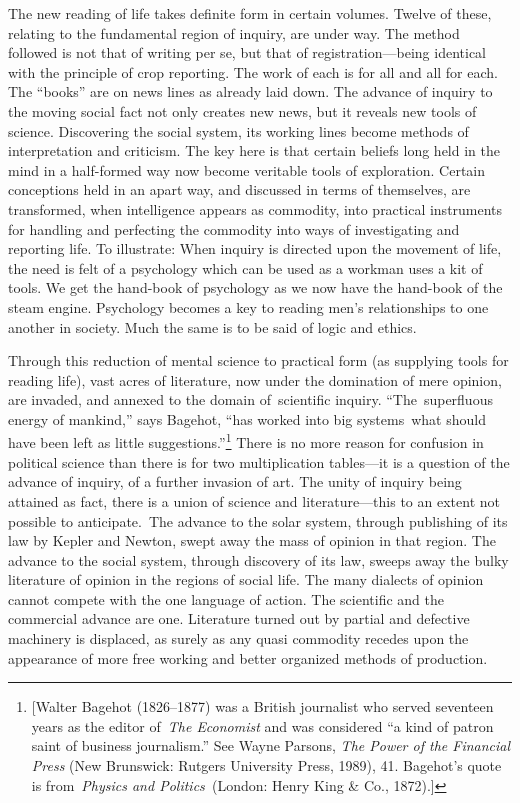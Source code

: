 \documentclass[openany,nobib]{tufte-book}
\begin{document}
The new reading of life takes definite form in certain volumes. Twelve
of these, relating to the fundamental region of inquiry, are under way.
The method followed is not that of writing per se, but that of
registration---being identical with the principle of crop reporting. The
work of each is for all and all for each. The ``books'' are on news
lines as already laid down. The advance of inquiry to the moving social
fact not only creates new news, but it reveals new tools of science.
Discovering the social system, its working lines become methods of
interpretation and criticism. The key here is that certain beliefs long
held in the mind in a half-formed way now become veritable tools of
exploration. Certain conceptions held in an apart way, and discussed in
terms of themselves, are transformed, when intelligence appears as
commodity, into practical instruments for handling and perfecting the
commodity into ways of investigating and reporting life. To illustrate:
When inquiry is directed upon the movement of life, the need is felt of
a psychology which can be used as a workman uses a kit of tools. We get
the hand-book of psychology as we now have the hand-book of the steam
engine. Psychology becomes a key to reading men's relationships to one
another in society. Much the same is to be said of logic and ethics.~

Through this reduction of mental science to practical form (as supplying
tools for reading life), vast acres of literature, now under the
domination of mere opinion, are invaded, and annexed to the domain
of~scientific inquiry. ``The~superfluous energy of mankind,'' says
Bagehot, ``has worked into big systems~what should have been left as
little suggestions.''\footnote{{[}Walter Bagehot (1826--1877) was a
  British journalist who served seventeen years as the editor
  of~\emph{The Economist} and was considered ``a kind of patron saint of
  business journalism.'' See Wayne Parsons, \emph{The Power of the
  Financial Press} (New Brunswick: Rutgers University Press, 1989), 41.
  Bagehot's quote is from~\emph{Physics and Politics~}(London: Henry
  King \& Co., 1872).{]}} There is no more reason for confusion in
political science than there is for two multiplication tables---it is a
question of the advance of inquiry, of a further invasion of art. The
unity of inquiry being attained as fact, there is a union of science and
literature---this to an extent not possible to anticipate.~The advance
to the solar system, through publishing of its law by Kepler and Newton,
swept away the mass of opinion in that region. The advance to the social
system, through discovery of its law, sweeps away the bulky literature
of opinion in the regions of social life. The many dialects of opinion
cannot compete with the one language of action. The scientific and the
commercial advance are one. Literature turned out by partial and
defective machinery is displaced, as surely as any quasi commodity
recedes upon the appearance of more free working and better organized
methods of production.~
\end{document}
